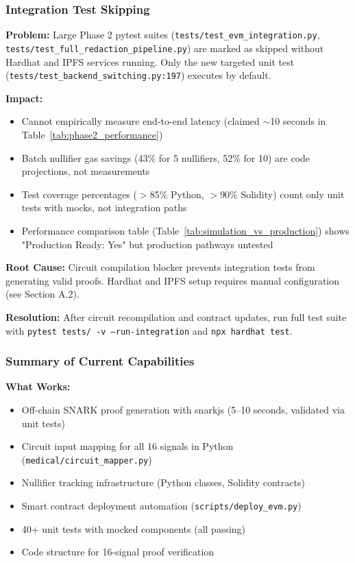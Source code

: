\subsubsection{Integration Test Skipping}

\textbf{Problem:} Large Phase 2 pytest suites (\texttt{tests/test\_evm\_integration.py}, \texttt{tests/test\_full\_redaction\_pipeline.py}) are marked as skipped without Hardhat and IPFS services running. Only the new targeted unit test (\texttt{tests/test\_backend\_switching.py:197}) executes by default.

\textbf{Impact:}
\begin{itemize}
    \item Cannot empirically measure end-to-end latency (claimed $\sim$10 seconds in Table~\ref{tab:phase2_performance})
    \item Batch nullifier gas savings (43\% for 5 nullifiers, 52\% for 10) are code projections, not measurements
    \item Test coverage percentages ($>$85\% Python, $>$90\% Solidity) count only unit tests with mocks, not integration paths
    \item Performance comparison table (Table~\ref{tab:simulation_vs_production}) shows "Production Ready: Yes" but production pathways untested
\end{itemize}

\textbf{Root Cause:} Circuit compilation blocker prevents integration tests from generating valid proofs. Hardhat and IPFS setup requires manual configuration (see Section A.2).

\textbf{Resolution:} After circuit recompilation and contract updates, run full test suite with \texttt{pytest tests/ -v --run-integration} and \texttt{npx hardhat test}.

\subsubsection{Summary of Current Capabilities}

\textbf{What Works:}
\begin{itemize}
    \item Off-chain SNARK proof generation with snarkjs (5--10 seconds, validated via unit tests)
    \item Circuit input mapping for all 16 signals in Python (\texttt{medical/circuit\_mapper.py})
    \item Nullifier tracking infrastructure (Python classes, Solidity contracts)
    \item Smart contract deployment automation (\texttt{scripts/deploy\_evm.py})
    \item 40+ unit tests with mocked components (all passing)
    \item Code structure for 16-signal proof verification
\end{itemize}

